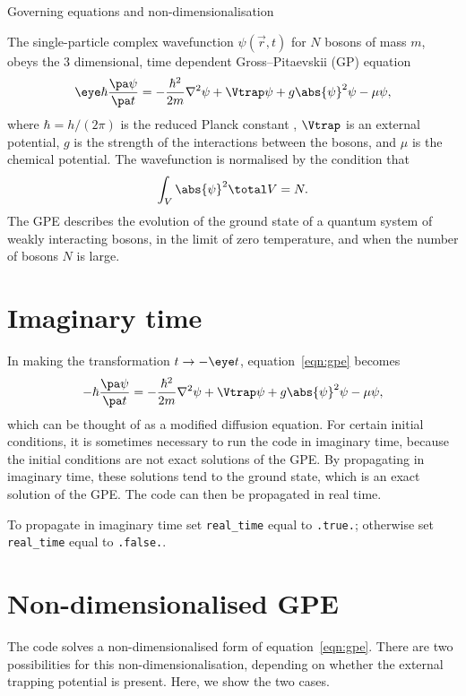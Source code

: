 
\begin{chapter}{\label{cha:equations}Governing equations and
  non-dimensionalisation}

  The single-particle complex wavefunction $\psi(\vec{r}, t)$ for $N$ bosons of
  mass $m$, obeys the 3 dimensional, time dependent Gross--Pitaevskii (GP)
  equation \citep{Gross61,Pitaevskii61}
  \begin{equation}
    \eye \hbar \frac{\pa \psi}{\pa t} = -\frac{\hbar^{2}}{2m} \nabla^{2} \psi +
    \Vtrap \psi + g \abs{\psi}^{2} \psi - \mu \psi,
    \label{eqn:gpe}
  \end{equation}
  where $\hbar = h/(2\pi)$ is the reduced Planck constant , $\Vtrap$ is an
  external potential, $g$ is the strength of the interactions between the
  bosons, and $\mu$ is the chemical potential.  The wavefunction is normalised
  by the condition that
  \begin{equation*}
    \int_{V}{\abs{\psi}^{2}}\total V = N.
  \end{equation*}
  The GPE describes the evolution of the ground state of a quantum system of
  weakly interacting bosons, in the limit of zero temperature, and when the
  number of bosons $N$ is large.

  \section{Imaginary time}
  In making the transformation $t \to -\eye t$, equation~\eqref{eqn:gpe}
  becomes
  \begin{equation*}
    -\hbar \frac{\pa \psi}{\pa t} = -\frac{\hbar^{2}}{2m} \nabla^{2} \psi +
    \Vtrap \psi + g \abs{\psi}^{2} \psi - \mu \psi,
  \end{equation*}
  which can be thought of as a modified diffusion equation.  For certain
  initial conditions, it is sometimes necessary to run the code in imaginary
  time, because the initial conditions are not exact solutions of the GPE.  By
  propagating in imaginary time, these solutions tend to the ground state,
  which is an exact solution of the GPE.  The code can then be propagated in
  real time.

  To propagate in imaginary time set \verb"real_time" equal to \verb".true.";
  otherwise set \verb"real_time" equal to \verb".false.".

  \section{Non-dimensionalised GPE}
  The code solves a non-dimensionalised form of equation~\eqref{eqn:gpe}.
  There are two possibilities for this non-dimensionalisation, depending on
  whether the external trapping potential is present.  Here, we show the two
  cases.


\end{chapter}
